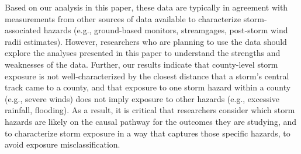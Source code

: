 Based on our analysis in this paper, these data are typically in agreement with
measurements from other sources of data available to characterize
storm-associated hazards (e.g., ground-based monitors, streamgages, post-storm
wind radii estimates).  However, researchers who are planning to use the data
should explore the analyses presented in this paper to understand the strengths
and weaknesses of the data.  Further, our results indicate that county-level storm
exposure is not well-characterized by the closest distance that a storm's
central track came to a county, and that exposure to one storm hazard within a
county (e.g., severe winds) does not imply exposure to other hazards (e.g.,
excessive rainfall, flooding). As a result, it is critical that researchers
consider which storm hazards are likely on the causal pathway for the outcomes
they are studying, and to characterize storm exposure in a way that captures
those specific hazards, to avoid exposure misclassification. 
